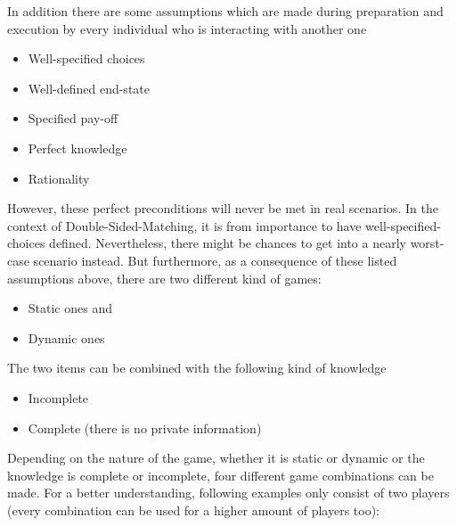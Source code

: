 In addition there are some assumptions which are made during preparation and execution by every individual who is interacting with another one \cite {gibbons1997gametheory}
\begin{itemize}
	\item Well-specified choices
	\item Well-defined end-state
	\item Specified pay-off
	\item Perfect knowledge
	\item Rationality 
\end{itemize}

However, these perfect preconditions will never be met in real scenarios. 
In the context of Double-Sided-Matching, it is from importance to have well-specified-choices defined. 
Nevertheless, there might be chances to get into a nearly worst-case scenario instead.
But furthermore, as a consequence of these listed assumptions above, there are two different kind of games:
 
\begin{itemize}
	\item Static ones and
	\item Dynamic ones
\end{itemize}

The two items can be combined with the following kind of knowledge

\begin{itemize}
	\item Incomplete
	\item Complete (there is no private information)
\end{itemize}

Depending on the nature of the game, whether it is static or dynamic or the knowledge is complete or incomplete, four different game combinations can be made.
For a better understanding, following examples only consist of two players (every combination can be used for a higher amount of players too):

